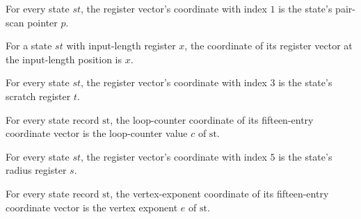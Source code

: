 \begin{lemma}
\label{Complexity.PathHard.St.toV_p}
\leanok
{}
For every state $st$, the register vector’s coordinate with index $1$ is the state’s
pair-scan pointer $p$.
\end{lemma}

\begin{lemma}
\label{Complexity.PathHard.St.toV_x}
\leanok
{}
For a state $st$ with input-length register $x$, the coordinate of its register vector
at the input-length position is $x$.
\end{lemma}

\begin{lemma}
\label{Complexity.PathHard.St.toV_t}
\leanok
{}
For every state $st$, the register vector’s coordinate with index $3$ is the state’s
scratch register $t$.
\end{lemma}

\begin{lemma}
\label{Complexity.PathHard.St.toV_c}
\leanok
{}
For every state record $\mathrm{st}$, the loop-counter coordinate of its fifteen-entry
coordinate vector is the loop-counter value $c$ of $\mathrm{st}$.
\end{lemma}

\begin{lemma}
\label{Complexity.PathHard.St.toV_s}
\leanok
{}
For every state $st$, the register vector’s coordinate with index $5$ is the state’s
radius register $s$.
\end{lemma}

\begin{lemma}
\label{Complexity.PathHard.St.toV_e}
\leanok
{}
For every state record $\mathrm{st}$, the vertex-exponent coordinate of its
fifteen-entry coordinate vector is the vertex exponent $e$ of $\mathrm{st}$.
\end{lemma}

